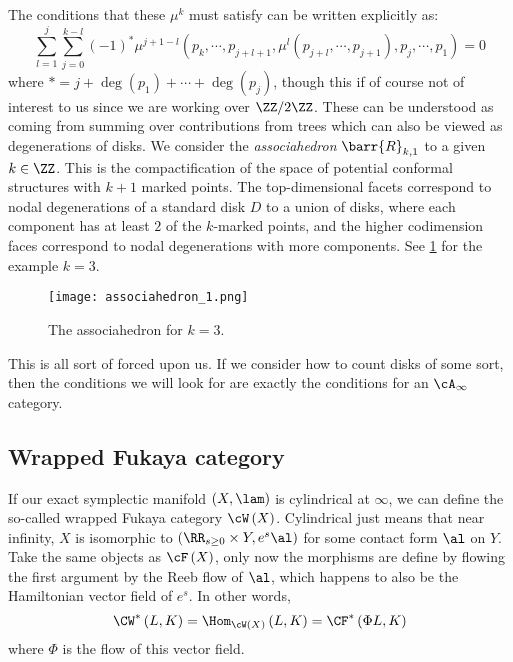 \documentclass{amsart}
\begin{document}
The conditions that these $\mu^k$ must satisfy can be written explicitly as:
\begin{equation}
\sum_{l=1}^j \sum_{j = 0}^{k-l}
\left( -1 \right)^* \mu^{j+1 -l}
\left( p_k , \cdots , p_{j + l + 1} , 
\mu^l\left( p_{j+l} , \cdots , p_{j+1} \right) , p_j , \cdots , p_1\right) = 0
\end{equation}
where $* = j + \deg\left( p_1 \right) + \cdots + \deg\left( p_j \right)$, 
though this if of course not of interest to us since we are working over $\ZZ / 2\ZZ$.
These can be understood as coming from summing over contributions from trees which
can also be viewed as degenerations of disks.
We consider the \emph{associahedron} $\barr{R}_{k,1}$
to a given $k\in \ZZ$.
This is the compactification of the space of potential conformal structures
with $k+1$ marked points. 
The top-dimensional facets correspond to nodal degenerations of a standard disk
$D$ to a union of disks, where each component has at least $2$ of
the $k$-marked points, and the higher codimension faces
correspond to nodal degenerations with more components. 
See \cref{fig:associahedron_1} for the example $k = 3$.

\begin{figure}
\centering
\texttt{[image: associahedron\_1.png]}
\caption{The associahedron for $k = 3$.}
\label{fig:associahedron_1}
\end{figure}

\begin{rmk}
This is all sort of forced upon us.
If we consider how to count disks of some sort, 
then the conditions we will look for are exactly the 
conditions for an $\cA_\infty$ category.
\end{rmk}

\subsection{Wrapped Fukaya category}

If our exact symplectic manifold
$\left( X , \lam \right)$
is cylindrical at $\infty$, we can define the so-called
wrapped Fukaya category $\cW\left( X \right)$.
Cylindrical just means that near infinity, $X$ is isomorphic to
$\left( \RR_{s\geq 0}\times Y , e^s \al \right)$ for some contact form
$\al$ on $Y$.
Take the same objects as $\cF\left( X \right)$,
only now the morphisms are define by flowing the first
argument by the Reeb flow of $\al$, which happens to
also be the Hamiltonian vector field of $e^s$.
In other words, 
\begin{equation}
\CW^*\left( L , K \right) =
\Hom_{\cW\left( X \right)}\left( L, K \right) = 
\CF^*\left( \Phi L , K \right)
\end{equation}
where $\Phi$ is the flow of this vector field.
\end{document}
